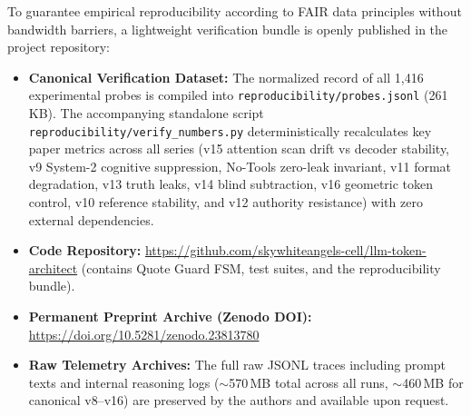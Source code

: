 \documentclass[11pt,a4paper]{article}
\begin{document}
To guarantee empirical reproducibility according to FAIR data principles without bandwidth barriers, a lightweight verification bundle is openly published in the project repository:
\begin{itemize}
    \item \textbf{Canonical Verification Dataset:} The normalized record of all 1,416 experimental probes is compiled into \texttt{reproducibility/probes.jsonl} (261\,KB). The accompanying standalone script \texttt{reproducibility/verify\_numbers.py} deterministically recalculates key paper metrics across all series (v15 attention scan drift vs decoder stability, v9 System-2 cognitive suppression, No-Tools zero-leak invariant, v11 format degradation, v13 truth leaks, v14 blind subtraction, v16 geometric token control, v10 reference stability, and v12 authority resistance) with zero external dependencies.
    \item \textbf{Code Repository:} \url{https://github.com/skywhiteangels-cell/llm-token-architect} (contains Quote Guard FSM, test suites, and the reproducibility bundle).
    \item \textbf{Permanent Preprint Archive (Zenodo DOI):} \url{https://doi.org/10.5281/zenodo.23813780}
    \item \textbf{Raw Telemetry Archives:} The full raw JSONL traces including prompt texts and internal reasoning logs ($\sim$570\,MB total across all runs, $\sim$460\,MB for canonical v8--v16) are preserved by the authors and available upon request.
\end{itemize}



\end{document}
